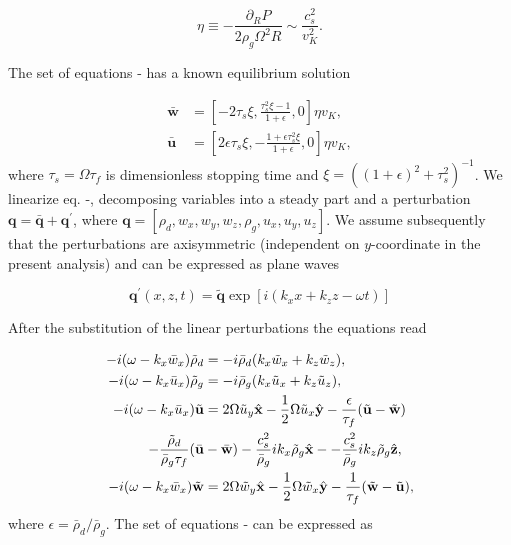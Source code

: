 \begin{equation}
\eta \equiv - \frac{\partial_R P}{2\rho_g\Omega^2 R} \sim \frac{c_s^2}{v_K^2}.
\end{equation}

The set of equations - has a known equilibrium
solution~\citep{N86}

\begin{align}
\bar{\mathbf{w}} &= \left[ 
 -2\tau_s\xi, \frac{\tau_s^2\xi - 1}{1+\epsilon},
 0
\right]\eta v_K, \label{eq:w0}\\
\bar{\mathbf{u}} &= \left[ 
 2\epsilon\tau_s\xi, -\frac{1 + \epsilon\tau_s^2\xi}{1+\epsilon},
 0
\right]\eta v_K, \label{eq:u0}
\end{align}
%
where $\tau_s = \Omega \tau_f$ is dimensionless stopping time and
$\xi = ((1+\epsilon)^2 + \tau_s^2)^{-1}$. We linearize eq.
-, decomposing variables into a steady part and a
perturbation $\mathbf{q} = \bar{\mathbf{q}} + \mathbf{q}^\prime$, where
$\mathbf{q}=[\rho_d, w_x, w_y, w_z, \rho_g, u_x, u_y, u_z]$. We assume
subsequently that the perturbations are axisymmetric (independent on
$y$-coordinate in the present analysis) and can be expressed as plane waves

\begin{equation}
   \label{eq:planar}
   \mathbf{q}^\prime(x,z,t) = \tilde{\mathbf{q}}
 \exp\left[i(k_x x + k_z z -\omega t)\right]
\end{equation}

After the substitution of the linear perturbations the equations read

\begin{align}
-i(\omega- k_x\bar{w}_x)\tilde{\rho}_d &= 
 - i \bar{\rho}_d(k_x\tilde{w}_x + k_z\tilde{w}_z), \label{lin1}\\
-i(\omega- k_x\bar{u}_x)\tilde{\rho}_g &= 
 - i \bar{\rho}_g(k_x\tilde{u}_x + k_z\tilde{u}_z), \label{lin2}\\
-i(\omega- k_x\bar{u}_x)\tilde{\mathbf{u}} &= 
 2\Omega \tilde{u}_y\hat{\mathbf{x}} - \frac{1}{2}\Omega \tilde{u}_x
 \hat{\mathbf{y}}
 -\frac{\epsilon}{\tau_f}(\tilde{\mathbf{u}} - \tilde{\mathbf{w}}) \notag\\
  -\frac{\tilde{\rho}_d}{\bar{\rho}_g\tau_f}
  (\bar{\mathbf{u}} &- \bar{\mathbf{w}})
  - \frac{c_s^2}{\bar{\rho}_g}ik_x\tilde{\rho}_g\hat{\mathbf{x}} -
  - \frac{c_s^2}{\bar{\rho}_g}ik_z\tilde{\rho}_g\hat{\mathbf{z}}, \label{lin3}\\
-i(\omega- k_x\bar{w}_x)\tilde{\mathbf{w}} &= 
 2\Omega \tilde{w}_y\hat{\mathbf{x}} - \frac{1}{2}\Omega \tilde{w}_x
 \hat{\mathbf{y}} 
 - \frac{1}{\tau_f} (\tilde{\mathbf{w}} - \tilde{\mathbf{u}}), \label{lin4}
\end{align}
%
where $\epsilon = \bar{\rho}_d/\bar{\rho}_g$. The set of equations
- can be expressed as

